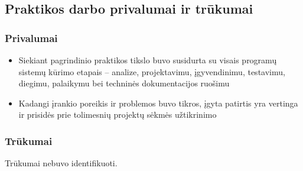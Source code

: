 \subsection{Praktikos darbo privalumai ir trūkumai}

\subsubsection*{Privalumai}
\begin{itemize}
    \item Siekiant pagrindinio praktikos tikslo buvo susidurta su visais programų sistemų kūrimo etapais -- analize, projektavimu, įgyvendinimu, testavimu, diegimu, palaikymu bei techninės dokumentacijos ruošimu
    \item Kadangi įrankio poreikis ir problemos buvo tikros, įgyta patirtis yra vertinga ir prisidės prie tolimesnių projektų sėkmės užtikrinimo
\end{itemize}

\subsubsection*{Trūkumai}

Trūkumai nebuvo identifikuoti.
